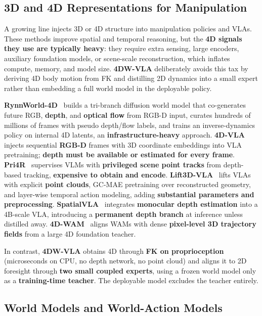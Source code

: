 \documentclass[journal]{IEEEtran}
\begin{document}
\subsection{3D and 4D Representations for Manipulation}

A growing line injects 3D or 4D structure into manipulation policies and
VLAs. These methods improve spatial and temporal reasoning, but the
\textbf{4D signals they use are typically heavy}: they require extra
sensing, large encoders, auxiliary foundation models, or scene-scale
reconstruction, which inflates compute, memory, and model size.
\textbf{4DW-VLA} deliberately avoids this tax by deriving 4D body motion
from FK and distilling 2D dynamics into a small expert rather than
embedding a full world model in the deployable policy.

\textbf{RynnWorld-4D}~\cite{rynnworld4d2026} builds a tri-branch
diffusion world model that co-generates future RGB, \textbf{depth}, and
\textbf{optical flow} from RGB-D input, curates hundreds of millions of
frames with pseudo depth/flow labels, and trains an inverse-dynamics
policy on internal 4D latents, an \textbf{infrastructure-heavy} approach.
\textbf{4D-VLA}~\cite{fourdvla2025} injects sequential \textbf{RGB-D}
frames with 3D coordinate embeddings into VLA pretraining; \textbf{depth
must be available or estimated for every frame}.
\textbf{Pri4R}~\cite{pri4r2026} supervises VLMs with \textbf{privileged
scene point tracks} from depth-based tracking, \textbf{expensive to
obtain and encode}. \textbf{Lift3D-VLA}~\cite{lift3dvla2026} lifts VLAs
with explicit \textbf{point clouds}, GC-MAE pretraining over reconstructed
geometry, and layer-wise temporal action modeling, adding
\textbf{substantial parameters and preprocessing}.
\textbf{SpatialVLA}~\cite{spatialvla2025} integrates \textbf{monocular
depth estimation} into a 4B-scale VLA, introducing a \textbf{permanent
depth branch} at inference unless distilled away.
\textbf{4D-WAM}~\cite{fourdwam2026} aligns WAMs with dense
\textbf{pixel-level 3D trajectory fields} from a large 4D foundation
teacher.

In contrast, \textbf{4DW-VLA} obtains 4D through \textbf{FK on
proprioception} (microseconds on CPU, no depth network, no point cloud)
and aligns it to 2D foresight through \textbf{two small coupled experts},
using a frozen world model only as a \textbf{training-time teacher}. The
deployable model excludes the teacher entirely.

\subsection{World Models and World-Action Models}
\end{document}
